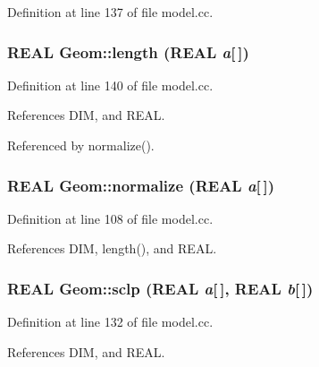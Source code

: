 Definition at line 137 of file model.cc.\hypertarget{namespaceGeom_418650983a2439f6f782c77539a43fe1}{
\subsubsection[{length}]{\setlength{\rightskip}{0pt plus 5cm}REAL Geom::length (REAL {\em a}\mbox{[}$\,$\mbox{]})}}
\label{namespaceGeom_418650983a2439f6f782c77539a43fe1}




Definition at line 140 of file model.cc.

References DIM, and REAL.

Referenced by normalize().\hypertarget{namespaceGeom_ee55a64ec95ad491647143eb3e788da6}{
\subsubsection[{normalize}]{\setlength{\rightskip}{0pt plus 5cm}REAL Geom::normalize (REAL {\em a}\mbox{[}$\,$\mbox{]})}}
\label{namespaceGeom_ee55a64ec95ad491647143eb3e788da6}




Definition at line 108 of file model.cc.

References DIM, length(), and REAL.\hypertarget{namespaceGeom_cdec0165d0e6b19e6273d02d902589b5}{
\subsubsection[{sclp}]{\setlength{\rightskip}{0pt plus 5cm}REAL Geom::sclp (REAL {\em a}\mbox{[}$\,$\mbox{]}, \/  REAL {\em b}\mbox{[}$\,$\mbox{]})}}
\label{namespaceGeom_cdec0165d0e6b19e6273d02d902589b5}




Definition at line 132 of file model.cc.

References DIM, and REAL.